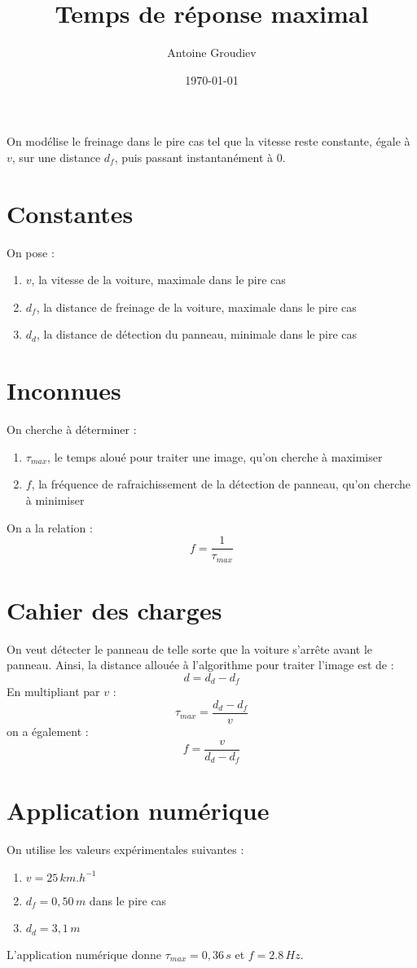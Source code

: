 \documentclass[12pt,a4paper]{article}
\author{Antoine Groudiev}
\title{Temps de réponse maximal}
\date{\today}
\begin{document}
\maketitle
On modélise le freinage dans le pire cas tel que la vitesse reste constante, égale à $v$, sur une distance $d_f$, puis passant instantanément à $0$.
\section{Constantes}
    On pose :
    \begin{enumerate}
        \item $v$, la vitesse de la voiture, maximale dans le pire cas
        \item $d_f$, la distance de freinage de la voiture, maximale dans le pire cas
        \item $d_d$, la distance de détection du panneau, minimale dans le pire cas
    \end{enumerate}

\section{Inconnues}
    On cherche à déterminer :
    \begin{enumerate}
        \item $\tau_{max}$, le temps aloué pour traiter une image, qu'on cherche à maximiser
        \item $f$, la fréquence de rafraichissement de la détection de panneau, qu'on cherche à minimiser
    \end{enumerate}

    On a la relation :
    $$f = \frac{1}{\tau_{max}}$$
\section{Cahier des charges}
    On veut détecter le panneau de telle sorte que la voiture s'arrête avant le panneau. 
    Ainsi, la distance allouée à l'algorithme pour traiter l'image est de :
    $$d = d_d - d_f$$
    En multipliant par $v$ :
    $$\boxed{\tau_{max} = \frac{d_d - d_f}{v}}$$
    on a également :
    $$\boxed{f = \frac{v}{d_d - d_f}}$$

\section{Application numérique}
On utilise les valeurs expérimentales suivantes :
\begin{enumerate}
    \item $v = 25 \, km.h^{-1}$
    \item $d_f = 0,50 \, m$ dans le pire cas
    \item $d_d = 3,1 \, m$
\end{enumerate}
L'application numérique donne $\boxed{\tau_{max} = 0,36 \, s}$ et $\boxed{f = 2.8 \, Hz}$.
\end{document}
